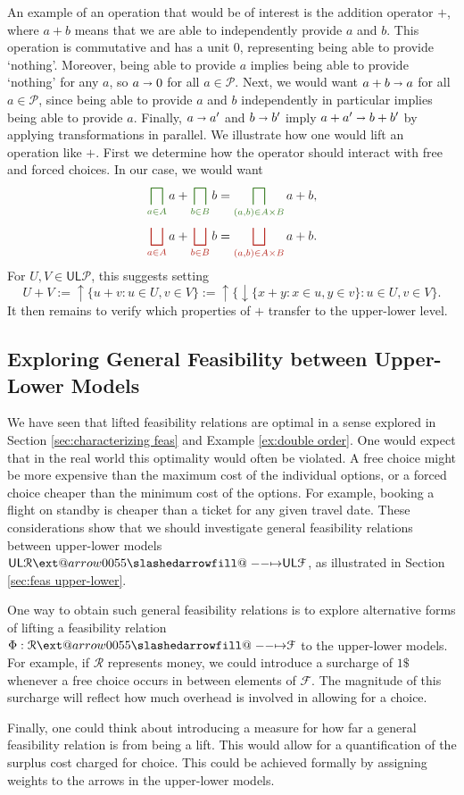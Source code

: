 \documentclass[12pt]{article}
\makeatletter
\theoremstyle{definition}
\theoremstyle{plain}
\theoremstyle{plain}
\theoremstyle{plain}
\theoremstyle{plain}
\theoremstyle{remark}
\theoremstyle{remark}
\newcommand{\mc}[1]{\mathcal{#1}}
\newcommand{\low}{\mathsf{L}}
\newcommand{\upper}{\mathsf{U}}
\newcommand{\upc}[1]{{\uparrow #1}}
\newcommand{\lwc}[1]{{\downarrow #1}}
\def\slashedarrowfill@#1#2#3#4#5{%
	$\m@th\thickmuskip0mu\medmuskip\thickmuskip\thinmuskip\thickmuskip
	\relax#5#1\mkern-7mu%
	\cleaders\hbox{$#5\mkern-2mu#2\mkern-2mu$}\hfill
	\mathclap{#3}\mathclap{#2}%
	\cleaders\hbox{$#5\mkern-2mu#2\mkern-2mu$}\hfill
	\mkern-7mu#4$%
}
\def\rightslashedarrowfill@{%
	\slashedarrowfill@\relbar\relbar\mapstochar\rightarrow}
\newcommand\xslashedrightarrow[2][]{%
	\ext@arrow 0055{\rightslashedarrowfill@}{#1}{#2}}
\newcommand{\cbigsqcap}[1]{\color{OliveGreen}\bigsqcap_{#1}\color{Black}}
\newcommand{\cbigsqcup}[1]{\color{BrickRed}\bigsqcup_{#1}\color{Black}}
\makeatother
\begin{document}
An example of an operation that would be of interest is the addition operator $+$, where $a+b$ means that we are able to independently provide $a$ and $b$. This operation is commutative and has a unit $0$, representing being able to provide `nothing'. Moreover, being able to provide $a$ implies being able to provide `nothing' for any $a$, so $a \shortrightarrow 0$ for all $a \in \mc{P}$. Next, we would want $a + b \shortrightarrow a$ for all $a \in \mc{P}$, since being able to provide $a$ and $b$ independently in particular implies being able to provide $a$. Finally, $a \shortrightarrow a'$ and $b \shortrightarrow b'$ imply $a+a' \shortrightarrow b+b'$ by applying transformations in parallel.
\newpage
We illustrate how one would lift an operation like $+$. First we determine how the operator should interact with free and forced choices. In our case, we would want
$$ {\cbigsqcap{a \in A} a} + {\cbigsqcap{b \in B} b} = \cbigsqcap{(a,b) \in A \times B} a+b,$$
$$ {\cbigsqcup{a \in A} a} + {\cbigsqcup{b \in B} b} = \cbigsqcup{(a,b) \in A \times B} a+b.$$
For $U,V \in \upper\low\mc{P}$, this suggests setting
$$ U + V := \upc \{ u+v : u \in U, v \in V \} := \upc \{ \lwc \{x+y : x \in u, y \in v\}: u \in U, v \in V \}.$$
It then remains to verify which properties of $+$ transfer to the upper-lower level.

\subsection{Exploring General Feasibility between Upper-Lower Models}\label{sec:dependencies}
We have seen that lifted feasibility relations are optimal in a sense explored in Section \ref{sec:characterizing feas} and Example \ref{ex:double order}. One would expect that in the real world this optimality would often be violated. A free choice might be more expensive than the maximum cost of the individual options, or a forced choice cheaper than the minimum cost of the options. For example, booking a flight on standby is cheaper than a ticket for any given travel date. These considerations show that we should investigate general feasibility relations between upper-lower models $\upper\low\mc{R} \xslashedrightarrow{} \upper\low\mc{F}$, as illustrated in Section \ref{sec:feas upper-lower}. 

One way to obtain such general feasibility relations is to explore alternative forms of lifting a feasibility relation $\Phi: \mc{R} \xslashedrightarrow{} \mc{F}$ to the upper-lower models. For example, if $\mc{R}$ represents money, we could introduce a surcharge of $1\$$ whenever a free choice occurs in between elements of $\mc{F}$. The magnitude of this surcharge will reflect how much overhead is involved in allowing for a choice.

Finally, one could think about introducing a measure for how far a general feasibility relation is from being a lift. This would allow for a quantification of the surplus cost charged for choice. This could be achieved formally by assigning weights to the arrows in the upper-lower models.  


\newpage
\printbibliography
\end{document}

